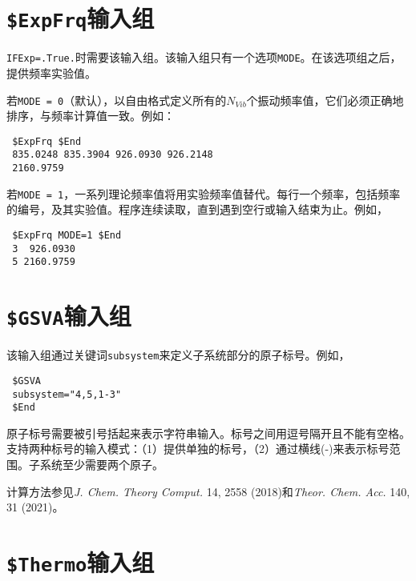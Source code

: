 \documentclass[12pt,a4paper,openany,twoside,cap,UTF8]{ctexbook}
\begin{document}
\section{\texttt{\$ExpFrq}输入组} \label{sec:inp-expfrq}

\verb|IFExp=.True.|时需要该输入组。该输入组只有一个选项\verb|MODE|。在该选项组之后，提供频率实验值。

\bigskip{}\noindent
若\verb|MODE = 0|（默认），以自由格式定义所有的$N_{Vib}$个振动频率值，它们必须正确地排序，与频率计算值一致。例如：
\begin{colorboxed}[oval=false,boxcolor=blue!75!black,bgcolor=blue!5!white]
\ttfamily
\begin{lstlisting}
 $ExpFrq $End
 835.0248 835.3904 926.0930 926.2148
 2160.9759
\end{lstlisting}\end{colorboxed}

\noindent
若\verb|MODE = 1|，一系列理论频率值将用实验频率值替代。每行一个频率，包括频率的编号，及其实验值。程序连续读取，直到遇到空行或输入结束为止。例如，
\begin{colorboxed}[oval=false,boxcolor=blue!75!black,bgcolor=blue!5!white]
\ttfamily
\begin{lstlisting}
 $ExpFrq MODE=1 $End
 3  926.0930
 5 2160.9759
\end{lstlisting}\end{colorboxed}


\section{\texttt{\$GSVA}输入组} \label{sec:inp-gsva}

该输入组通过关键词\verb|subsystem|来定义子系统部分的原子标号。例如，
\begin{colorboxed}[oval=false,boxcolor=blue!75!black,bgcolor=blue!5!white]
\ttfamily
\begin{lstlisting}
 $GSVA
 subsystem="4,5,1-3"
 $End
\end{lstlisting}\end{colorboxed}

原子标号需要被引号括起来表示字符串输入。标号之间用逗号隔开且不能有空格。支持两种标号的输入模式：（1）提供单独的标号，（2）通过横线(-)来表示标号范围。子系统至少需要两个原子。

计算方法参见\textit{J. Chem. Theory Comput.} 14, 2558 (2018)和\textit{Theor. Chem. Acc.} 140, 31 (2021)。

\section{\texttt{\$Thermo}输入组} \label{sec:inp-thermo}
\end{document}
